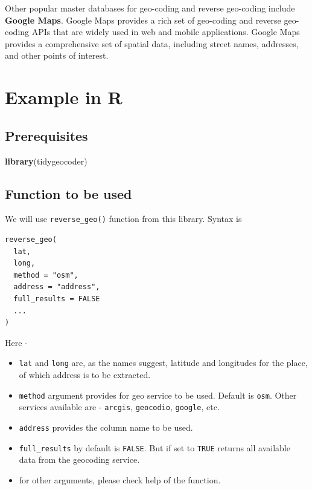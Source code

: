 \documentclass[
]{book}
\newenvironment{Shaded}{\begin{snugshade}}{\end{snugshade}}
\newcommand{\FunctionTok}[1]{\textcolor[rgb]{0.13,0.29,0.53}{\textbf{#1}}}
\newcommand{\NormalTok}[1]{#1}
\providecommand{\tightlist}{%
  \setlength{\itemsep}{0pt}\setlength{\parskip}{0pt}}
\begin{document}
Other popular master databases for geo-coding and reverse geo-coding include \textbf{Google Maps}. Google Maps provides a rich set of geo-coding and reverse geo-coding APIs that are widely used in web and mobile applications. Google Maps provides a comprehensive set of spatial data, including street names, addresses, and other points of interest.

\hypertarget{example-in-r}{%
\section{Example in R}\label{example-in-r}}

\hypertarget{prerequisites-5}{%
\subsection{Prerequisites}\label{prerequisites-5}}

\begin{Shaded}
\begin{Highlighting}[]
\FunctionTok{library}\NormalTok{(tidygeocoder)}
\end{Highlighting}
\end{Shaded}

\hypertarget{function-to-be-used}{%
\subsection{Function to be used}\label{function-to-be-used}}

We will use \texttt{reverse\_geo()} function from this library. Syntax is

\begin{verbatim}
reverse_geo(
  lat,
  long,
  method = "osm",
  address = "address",
  full_results = FALSE
  ...
)
\end{verbatim}

Here -

\begin{itemize}
\tightlist
\item
  \texttt{lat} and \texttt{long} are, as the names suggest, latitude and longitudes for the place, of which address is to be extracted.
\item
  \texttt{method} argument provides for geo service to be used. Default is \texttt{osm}. Other services available are - \texttt{arcgis}, \texttt{geocodio}, \texttt{google}, etc.
\item
  \texttt{address} provides the column name to be used.
\item
  \texttt{full\_results} by default is \texttt{FALSE}. But if set to \texttt{TRUE} returns all available data from the geocoding service.
\item
  for other arguments, please check help of the function.
\end{itemize}
\end{document}
